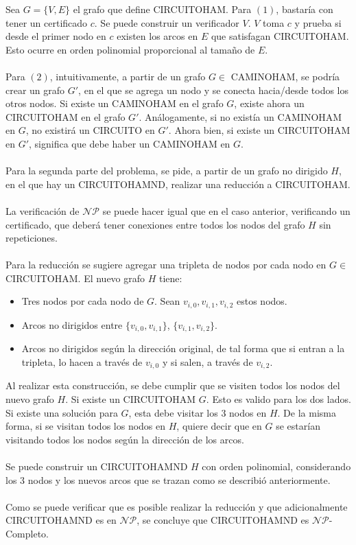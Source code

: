 \documentclass{article}
\def\NP{\mathcal{NP}}
\begin{document}
Sea $G=\{V,E\}$ el grafo que define CIRCUITOHAM. Para $(1)$, bastaría con tener un certificado $c$. Se puede construir un verificador $V$. $V$ toma $c$ y prueba si desde el primer nodo en $c$ existen los arcos en $E$ que satisfagan CIRCUITOHAM. Esto ocurre en orden polinomial proporcional al tamaño de $E$.
\\\\
Para $(2)$, intuitivamente, a partir de un grafo $G \in$ CAMINOHAM, se podría crear un grafo $G'$, en el que se agrega un nodo y se conecta hacia/desde todos los otros nodos. Si existe un CAMINOHAM en el grafo $G$, existe ahora un CIRCUITOHAM en el grafo $G'$. Análogamente, si no existía un CAMINOHAM en $G$, no existirá un CIRCUITO en $G'$. Ahora bien, si existe un CIRCUITOHAM en $G'$, significa que debe haber un CAMINOHAM en $G$.
\\\\
Para la segunda parte del problema, se pide, a partir de un grafo no dirigido $H$, en el que hay un CIRCUITOHAMND, realizar una reducción a CIRCUITOHAM.
\\\\
La verificación de $\NP$ se puede hacer igual que en el caso anterior, verificando un certificado, que deberá tener conexiones entre todos los nodos del grafo $H$ sin repeticiones.
\\\\
Para la reducción se sugiere agregar una tripleta de nodos por cada nodo en $G \in$ CIRCUITOHAM. El nuevo grafo $H$ tiene:
\begin{itemize}
	\item Tres nodos por cada nodo de $G$. Sean $v_{i,0}, v_{i,1}, v_{i,2}$ estos nodos.
	\item Arcos no dirigidos entre $\{v_{i,0}, v_{i,1}\}$, $\{v_{i,1}, v_{i,2}\}$.
	\item Arcos no dirigidos según la dirección original, de tal forma que si entran a la tripleta, lo hacen a través de $v_{i,0}$ y si salen, a través de $v_{i,2}$.
\end{itemize}
Al realizar esta construcción, se debe cumplir que se visiten todos los nodos del nuevo grafo $H$. Si existe un CIRCUITOHAM $G$. Esto es valido para los dos lados. Si existe una solución para $G$, esta debe visitar los 3 nodos en $H$. De la misma forma, si se visitan todos los nodos en $H$, quiere decir que en $G$ se estarían visitando todos los nodos según la dirección de los arcos.
\\\\
Se puede construir un CIRCUITOHAMND $H$ con orden polinomial, considerando los 3 nodos y los nuevos arcos que se trazan como se describió anteriormente.
\\\\
Como se puede verificar que es posible realizar la reducción y que adicionalmente CIRCUITOHAMND es en $\NP$, se concluye que CIRCUITOHAMND es $\NP$-Completo.
\end{document}
